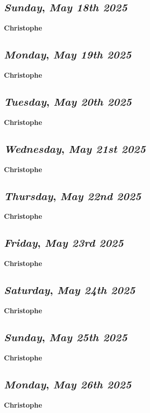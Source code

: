 \def\day{\textit{May 18th 2025}}
\def\weekday{\textit{Sunday}}
\subsection*{\weekday, \day}
\textbf {Christophe}

\def\day{\textit{May 19th 2025}}
\def\weekday{\textit{Monday}}
\subsection*{\weekday, \day}
\textbf {Christophe}

\def\day{\textit{May 20th 2025}}
\def\weekday{\textit{Tuesday}}
\subsection*{\weekday, \day}
\textbf {Christophe}

\def\day{\textit{May 21st 2025}}
\def\weekday{\textit{Wednesday}}
\subsection*{\weekday, \day}
\textbf {Christophe}

\def\day{\textit{May 22nd 2025}}
\def\weekday{\textit{Thursday}}
\subsection*{\weekday, \day}
\textbf {Christophe}

\def\day{\textit{May 23rd 2025}}
\def\weekday{\textit{Friday}}
\subsection*{\weekday, \day}
\textbf {Christophe}

\def\day{\textit{May 24th 2025}}
\def\weekday{\textit{Saturday}}
\subsection*{\weekday, \day}
\textbf {Christophe}

\def\day{\textit{May 25th 2025}}
\def\weekday{\textit{Sunday}}
\subsection*{\weekday, \day}
\textbf {Christophe}

\def\day{\textit{May 26th 2025}}
\def\weekday{\textit{Monday}}
\subsection*{\weekday, \day}
\textbf {Christophe}

